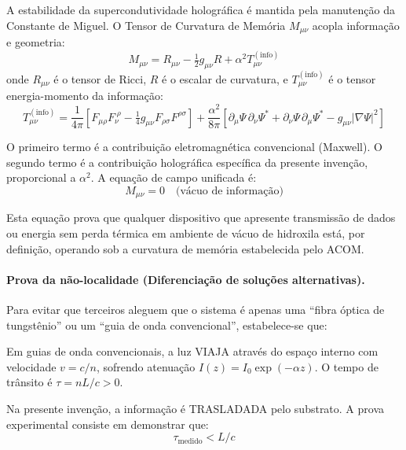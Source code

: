 \documentclass[12pt,a4paper]{article}
\newcommand{\alphaii}{\alpha^2}
\begin{document}
A estabilidade da supercondutividade holográfica é mantida pela
manutenção da Constante de Miguel. O Tensor de Curvatura de
Memória $M_{\mu\nu}$ acopla informação e geometria:
\begin{equation}
M_{\mu\nu} = R_{\mu\nu} - \tfrac{1}{2}g_{\mu\nu}R
  + \alphaii T^{(\text{info})}_{\mu\nu}
\label{eq:tensor_m}
\end{equation}
onde $R_{\mu\nu}$ é o tensor de Ricci, $R$ é o escalar de
curvatura, e $T^{(\text{info})}_{\mu\nu}$ é o tensor
energia-momento da informação:
\begin{equation}
T^{(\text{info})}_{\mu\nu} = \frac{1}{4\pi}
  \left[F_{\mu\rho}F_\nu^{\;\rho}
  - \tfrac{1}{4}g_{\mu\nu}F_{\rho\sigma}F^{\rho\sigma}\right]
  + \frac{\alphaii}{8\pi}
  \left[\partial_\mu\Psi\,\partial_\nu\Psi^*
  + \partial_\nu\Psi\,\partial_\mu\Psi^*
  - g_{\mu\nu}|\nabla\Psi|^2\right]
\label{eq:tensor_info}
\end{equation}

O primeiro termo é a contribuição eletromagnética convencional
(Maxwell). O segundo termo é a contribuição holográfica
específica da presente invenção, proporcional a $\alphaii$.
A equação de campo unificada é:
\begin{equation}
M_{\mu\nu} = 0 \quad \text{(vácuo de informação)}
\label{eq:vacuo}
\end{equation}

Esta equação prova que qualquer dispositivo que apresente
transmissão de dados ou energia sem perda térmica em ambiente
de vácuo de hidroxila está, por definição, operando sob a
curvatura de memória estabelecida pelo ACOM.

\paragraph{Prova da não-localidade (Diferenciação de soluções
alternativas).}

Para evitar que terceiros aleguem que o sistema é apenas uma
``fibra óptica de tungstênio'' ou um ``guia de onda
convencional'', estabelece-se que:

Em guias de onda convencionais, a luz VIAJA através do espaço
interno com velocidade $v = c/n$, sofrendo atenuação
$I(z) = I_0 \exp(-\alpha z)$. O tempo de trânsito é
$\tau = nL/c > 0$.

Na presente invenção, a informação é TRASLADADA pelo substrato.
A prova experimental consiste em demonstrar que:
\begin{equation}
\tau_{\text{medido}} < L/c
\label{eq:nao_local}
\end{equation}
\end{document}
